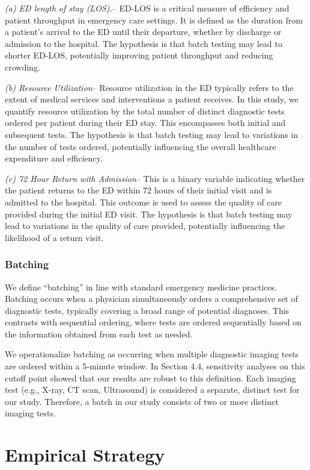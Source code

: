 \documentclass{article}
\begin{document}
\emph{(a) ED length of stay (LOS).}-- ED-LOS is a critical measure of
efficiency and patient throughput in emergency care settings. It is
defined as the duration from a patient's arrival to the ED until their
departure, whether by discharge or admission to the hospital. The
hypothesis is that batch testing may lead to shorter ED-LOS, potentially
improving patient throughput and reducing crowding.

\emph{(b) Resource Utilization}-- Resource utilization in the ED
typically refers to the extent of medical services and interventions a
patient receives. In this study, we quantify resource utilization by the
total number of distinct diagnostic tests ordered per patient during
their ED stay. This encompasses both initial and subsequent tests. The
hypothesis is that batch testing may lead to variations in the number of
tests ordered, potentially influencing the overall healthcare
expenditure and efficiency.

\emph{(c) 72 Hour Return with Admission}-- This is a binary variable
indicating whether the patient returns to the ED within 72 hours of
their initial visit and is admitted to the hospital. This outcome is
used to assess the quality of care provided during the initial ED visit.
The hypothesis is that batch testing may lead to variations in the
quality of care provided, potentially influencing the likelihood of a
return visit.

\hypertarget{batching}{%
\subsubsection{Batching}\label{batching}}

We define ``batching'' in line with standard emergency medicine
practices. Batching occurs when a physician simultaneously orders a
comprehensive set of diagnostic tests, typically covering a broad range
of potential diagnoses. This contrasts with sequential ordering, where
tests are ordered sequentially based on the information obtained from
each test as needed.

We operationalize batching as occurring when multiple diagnostic imaging
tests are ordered within a 5-minute window. In Section 4.4, sensitivity
analyses on this cutoff point showed that our results are robust to this
definition. Each imaging test (e.g., X-ray, CT scan, Ultrasound) is
considered a separate, distinct test for our study. Therefore, a batch
in our study consists of two or more distinct imaging tests.

\hypertarget{sec:3}{%
\section{Empirical Strategy}\label{sec:3}}
\end{document}
